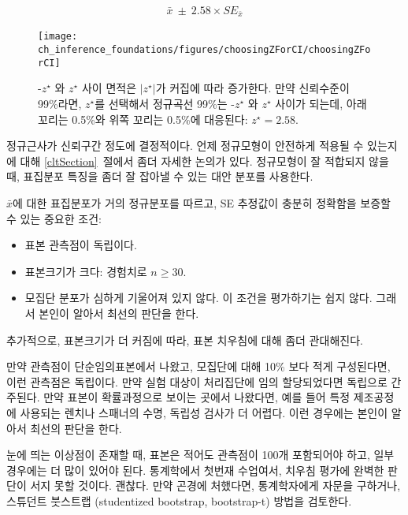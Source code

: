 \begin{eqnarray}
\bar{x}\ \pm\ 2.58\times SE_{\bar{x}}
\label{99PercCIForMean}
\end{eqnarray}

\begin{figure}[h]
\centering
\texttt{[image: ch\_inference\_foundations/figures/choosingZForCI/choosingZForCI]}
\caption{-$z^{\star}$ 와 $z^{\star}$ 사이 면적은 $|z^{\star}|$가 커집에 따라 증가한다. 만약 신뢰수준이 99\%라면, $z^{\star}$를 선택해서 정규곡선 99\%는 -$z^{\star}$ 와 $z^{\star}$ 사이가 되는데, 아래 꼬리는 0.5\%와 위쪽 꼬리는 0.5\%에 대응된다: $z^{\star}=2.58$.}
\label{choosingZForCI}
\end{figure}

정규근사가 신뢰구간 정도에 결정적이다. 언제 정규모형이 안전하게 적용될 수 있는지에 대해 \ref{cltSection}~절에서 좀더 자세한 논의가 있다. 정규모형이 잘 적합되지 않을 때, 표집분포 특징을 좀더 잘 잡아낼 수 있는 대안 분포를 사용한다.

\begin{termBox}{
$\bar{x}$에 대한 표집분포가 거의 정규분포를 따르고, SE 추정값이 충분히 정확함을 보증할 수 있는 중요한 조건:
\begin{itemize}
\setlength{\itemsep}{0mm}
\item 표본 관측점이 독립이다.
\item 표본크기가 크다: 경험치로 $n\geq30$.
\item 모집단 분포가 심하게 기울어져 있지 않다. 이 조건을 평가하기는 쉽지 않다. 그래서 본인이 알아서 최선의 판단을 한다.
\end{itemize}
추가적으로, 표본크기가 더 커짐에 따라, 표본 치우침에 대해 좀더 관대해진다.}
\end{termBox}

\begin{tipBox}{
만약 관측점이 단순임의표본에서 나왔고, 모집단에 대해 10\% 보다 적게 구성된다면, 이런 관측점은 독립이다.
만약 실험 대상이 처리집단에 임의 할당되었다면 독립으로 간주된다.
만약 표본이 확률과정으로 보이는 곳에서 나왔다면, 예를 들어 특정 제조공정에 사용되는 렌치나 스패너의 수명, 독립성 검사가 더 어렵다. 이런 경우에는 본인이 알아서 최선의 판단을 한다.}
\end{tipBox}

\begin{tipBox}{
눈에 띄는 이상점이 존재할 때, 표본은 적어도 관측점이 100개 포함되어야 하고, 일부 경우에는 더 많이 있어야 된다.
통계학에서 첫번재 수업여서, 치우침 평가에 완벽한 판단이 서지 못할 것이다. 괜찮다. 만약 곤경에 처했다면, 통계학자에게 자문을 구하거나, 스튜던트 붓스트랩 (studentized bootstrap, bootstrap-t) 방법을 검토한다.}
\end{tipBox}

